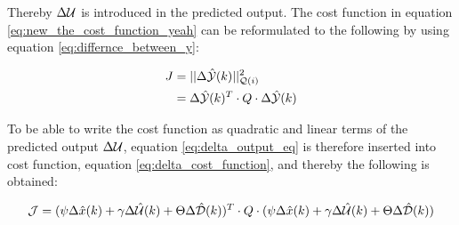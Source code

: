 Thereby $\Delta \CMcal{U}$ is introduced in the predicted output. The cost function in equation \ref{eq:new_the_cost_function_yeah} can be reformulated to the following by using equation \ref{eq:differnce_between_y}:

\begin{equation}\begin{aligned}\label{eq:delta_cost_function}
	J &= ||\Delta\hat{\CMcal{Y}}(k)||_{\CMcal{Q}(i)}^2\\
	  &= \Delta\hat{\CMcal{Y}}(k)^T \cdot Q \cdot \Delta\hat{\CMcal{Y}}(k)
	\end{aligned}
\end{equation}

To be able to write the cost function as quadratic and linear terms of the predicted output $\Delta\CMcal{U}$, equation \ref{eq:delta_output_eq} is therefore inserted into cost function, equation \ref{eq:delta_cost_function}, and thereby the following is obtained:

\begin{equation}\label{eq:cost_function_with_all_the_crap}
	\CMcal{J} = (\psi\Delta \hat{x}(k) + \gamma\Delta \hat{\CMcal{U}}(k) + \Theta\Delta \hat{\CMcal{D}}(k))^T\cdot Q \cdot (\psi\Delta \hat{x}(k) + \gamma\Delta \hat{\CMcal{U}}(k) + \Theta\Delta \hat{\CMcal{D}}(k))
\end{equation}



